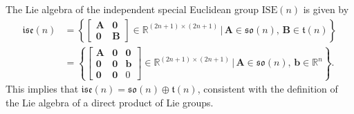 \begin{example}
    The Lie algebra of the independent special Euclidean group $\text{ISE}(n)$ is given by
    \begin{align*}
        \mathfrak{ise}(n) &= \left\{\begin{bmatrix}
            \mathbf{A} & \mathbf{0}\\
            \mathbf{0} & \mathbf{B}
        \end{bmatrix} \in \mathbb{R}^{(2n+1)\times(2n+1)}\,\biggl|\,  \mathbf{A}\in\mathfrak{so}(n),\,\mathbf{B}\in\mathfrak{t}(n)\right\}\\
        &= \left\{\begin{bmatrix}
            \mathbf{A} & \mathbf{0} & \mathbf{0}\\
            \mathbf{0} & \mathbf{0} & \mathbf{b}\\
            \mathbf{0} & \mathbf{0} & 0
        \end{bmatrix} \in \mathbb{R}^{(2n+1)\times(2n+1)}\,\Biggl|\,  \mathbf{A}\in\mathfrak{so}(n),\,\mathbf{b}\in\mathbb{R}^n\right\}.
    \end{align*}
    This implies that $\mathfrak{ise}(n) = \mathfrak{so}(n)\oplus\mathfrak{t}(n)$, consistent with the definition of the Lie algebra of a direct product of Lie groups.
\end{example}
